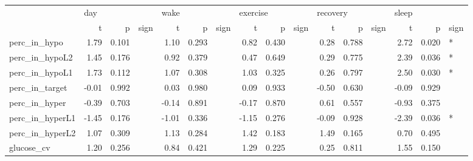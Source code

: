 \begin{tabular}{lrrlrrlrrlrrlrrl}
\toprule
{} & \multicolumn{3}{l}{day} & \multicolumn{3}{l}{wake} & \multicolumn{3}{l}{exercise} & \multicolumn{3}{l}{recovery} & \multicolumn{3}{l}{sleep} \\
{} &     t &      p & sign &     t &      p & sign &        t &      p & sign &        t &      p & sign &     t &      p & sign \\
\midrule
perc_in_hypo    &  1.79 &  0.101 &      &  1.10 &  0.293 &      &     0.82 &  0.430 &      &     0.28 &  0.788 &      &  2.72 &  0.020 &    * \\
perc_in_hypoL2  &  1.45 &  0.176 &      &  0.92 &  0.379 &      &     0.47 &  0.649 &      &     0.29 &  0.775 &      &  2.39 &  0.036 &    * \\
perc_in_hypoL1  &  1.73 &  0.112 &      &  1.07 &  0.308 &      &     1.03 &  0.325 &      &     0.26 &  0.797 &      &  2.50 &  0.030 &    * \\
perc_in_target  & -0.01 &  0.992 &      &  0.03 &  0.980 &      &     0.09 &  0.933 &      &    -0.50 &  0.630 &      & -0.09 &  0.929 &      \\
perc_in_hyper   & -0.39 &  0.703 &      & -0.14 &  0.891 &      &    -0.17 &  0.870 &      &     0.61 &  0.557 &      & -0.93 &  0.375 &      \\
perc_in_hyperL1 & -1.45 &  0.176 &      & -1.01 &  0.336 &      &    -1.15 &  0.276 &      &    -0.09 &  0.928 &      & -2.39 &  0.036 &    * \\
perc_in_hyperL2 &  1.07 &  0.309 &      &  1.13 &  0.284 &      &     1.42 &  0.183 &      &     1.49 &  0.165 &      &  0.70 &  0.495 &      \\
glucose_cv      &  1.20 &  0.256 &      &  0.84 &  0.421 &      &     1.29 &  0.225 &      &     0.25 &  0.811 &      &  1.55 &  0.150 &      \\
\bottomrule
\end{tabular}

